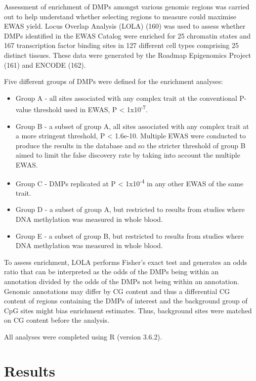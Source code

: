 \documentclass[11pt,oneside]{bristolthesis}
\providecommand{\tightlist}{%
  \setlength{\itemsep}{0pt}\setlength{\parskip}{0pt}}
\begin{document}
Assessment of enrichment of DMPs amongst various genomic regions was carried out to help understand whether selecting regions to measure could maximise EWAS yield. Locus Overlap Analysis (LOLA) (160) was used to assess whether DMPs identified in the EWAS Catalog were enriched for 25 chromatin states and 167 transcription factor binding sites in 127 different cell types comprising 25 distinct tissues. These data were generated by the Roadmap Epigenomics Project (161) and ENCODE (162).

Five different groups of DMPs were defined for the enrichment analyses:
\begin{itemize}
\tightlist
\item
  Group A - all sites associated with any complex trait at the conventional P-value threshold used in EWAS, P \textless{} 1x10\textsuperscript{-7}.
\item
  Group B - a subset of group A, all sites associated with any complex trait at a more stringent threshold, P \textless{} 1.6e-10. Multiple EWAS were conducted to produce the results in the database and so the stricter threshold of group B aimed to limit the false discovery rate by taking into account the multiple EWAS.
\item
  Group C - DMPs replicated at P \textless{} 1x10\textsuperscript{-4} in any other EWAS of the same trait.
\item
  Group D - a subset of group A, but restricted to results from studies where DNA methylation was measured in whole blood.
\item
  Group E - a subset of group B, but restricted to results from studies where DNA methylation was measured in whole blood.
\end{itemize}
To assess enrichment, LOLA performs Fisher's exact test and generates an odds ratio that can be interpreted as the odds of the DMPs being within an annotation divided by the odds of the DMPs not being within an annotation. Genomic annotations may differ by CG content and thus a differential CG content of regions containing the DMPs of interest and the background group of CpG sites might bias enrichment estimates. Thus, background sites were matched on CG content before the analysis.

All analyses were completed using R (version 3.6.2).

\newpage

\hypertarget{results-04}{%
\section{Results}\label{results-04}}
\end{document}
